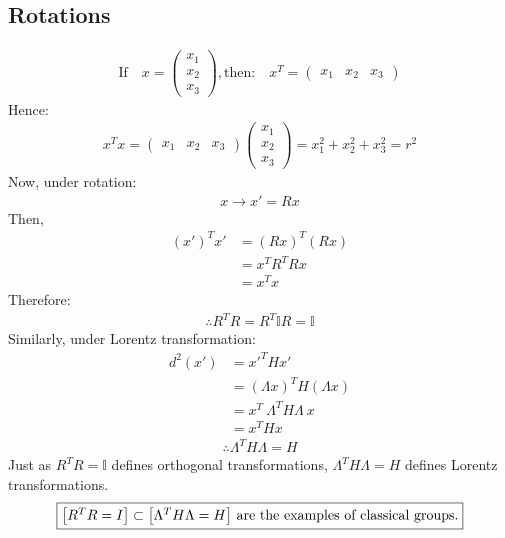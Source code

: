 \documentclass[14pt]{article} %
\begin{document}
\subsection*{Rotations}
\begin{align*}
\text{If}\quad  x = \begin{pmatrix}
x_1 \\
x_2 \\
x_3
\end{pmatrix}, 
\text{then:} \quad
x^T = \begin{pmatrix}
x_1 & x_2 & x_3
\end{pmatrix}
\end{align*}
Hence:
\begin{align*}
x^T x = 
\begin{pmatrix}
x_1 & x_2 & x_3
\end{pmatrix}
\begin{pmatrix}
x_1 \\
x_2 \\
x_3
\end{pmatrix}
= x_1^2 + x_2^2 + x_3^2
= r^2
\end{align*}
Now, under rotation:
\begin{align*}
x \to x' = R x
\end{align*}
Then,
\begin{align*}
    (x')^T x' &= (Rx)^T (Rx) \\
    &= x^T R^T R x \\
    &= x^T x
\end{align*}
Therefore:
\begin{align*}
\therefore\boxed{  R^T R = R^T \mathbb{I} R = \mathbb{I}}
\end{align*}
Similarly, under Lorentz transformation:
\begin{align*}
    d^2(x') &= x'^T H x' \\
    &= (\Lambda x)^T H (\Lambda x) \\
    &= x^T~\Lambda^T H \Lambda~x \\
    &= x^T H x
\end{align*}
\begin{align*}
\therefore \boxed{\Lambda^T H \Lambda = H}
\end{align*}
Just as $R^T R = \mathbb{I}$ defines orthogonal transformations, $\Lambda^T H \Lambda = H$ defines Lorentz transformations.
$$\fbox{$\left[R^T R = I\right] \subset \left[\Lambda^T H \Lambda = H\right]$ \text{are the examples of classical groups.}}$$
\end{document}
